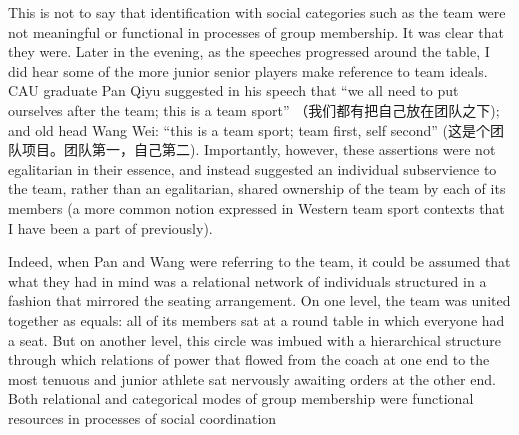 \begin{CJK}{UTF8}{gbsn}
This is not to say that identification with social categories such as the team were not meaningful or functional in processes of group membership. It was clear that they were.  Later in the evening, as the speeches progressed around the table, I did hear some of the more junior senior players make reference to team ideals.  CAU graduate Pan Qiyu suggested in his speech that ``we all need to put ourselves after the team; this is a team sport'' （我们都有把自己放在团队之下); and old head Wang Wei: ``this is a team sport; team first, self second'' (这是个团队项目。团队第一，自己第二).  Importantly, however, these assertions were not egalitarian in their essence, and instead suggested an individual subservience to the team, rather than an egalitarian, shared ownership of the team by each of its members (a more common notion expressed in Western team sport contexts that I have been a part of previously).

Indeed, when Pan and Wang were referring to the team, it could be assumed that what they had in mind was a relational network of individuals structured in a fashion that mirrored the seating arrangement. On one level, the team was united together as equals: all of its members sat at a round table in which everyone had a seat. But on another level, this circle was imbued with a hierarchical structure through which relations of power that flowed from the coach at one end to the most tenuous and junior athlete sat nervously awaiting orders at the other end.  Both relational and categorical modes of group membership were functional resources in processes of social coordination












            \end{CJK}
